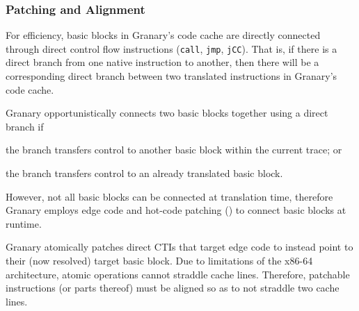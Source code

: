 \documentclass[preprint]{sigplanconf}
\begin{document}





\subsubsection{Patching and Alignment}\label{sec:patching}
For efficiency, basic blocks in Granary's code cache are directly connected through direct control flow instructions (\texttt{call}, \texttt{jmp}, \texttt{jCC}). That is, if there is a direct branch from one native instruction to another, then there will be a corresponding direct branch between two translated instructions in Granary's code cache.

Granary opportunistically connects two basic blocks together using a direct branch if \begin{inparaenum}[i)]
	\item the branch transfers control to another basic block within the current trace; or
	\item the branch transfers control to an already translated basic block.
\end{inparaenum} However, not all basic blocks can be connected at translation time, therefore Granary employs edge code and hot-code patching () to connect basic blocks at runtime.

Granary atomically patches direct CTIs that target edge code to instead point to their (now resolved) target basic block. Due to limitations of the x86-64 architecture, atomic operations cannot straddle cache lines. Therefore, patchable instructions (or parts thereof) must be aligned so as to not straddle two cache lines.
\end{document}
